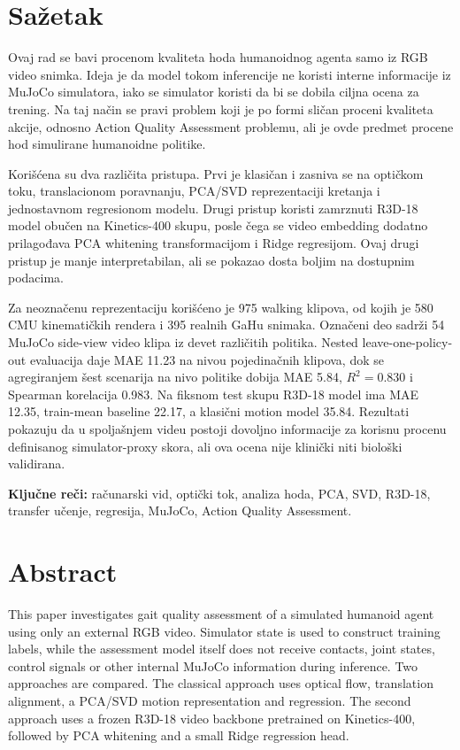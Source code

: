 ﻿\documentclass[12pt,a4paper]{report}
\begin{document}
\chapter*{Sažetak}
Ovaj rad se bavi procenom kvaliteta hoda humanoidnog agenta samo iz RGB video
snimka. Ideja je da model tokom inferencije ne koristi interne informacije iz
MuJoCo simulatora, iako se simulator koristi da bi se dobila ciljna ocena za
trening. Na taj način se pravi problem koji je po formi sličan proceni kvaliteta
akcije, odnosno Action Quality Assessment problemu, ali je ovde predmet procene
hod simulirane humanoidne politike.

Korišćena su dva različita pristupa. Prvi je klasičan i zasniva se na optičkom
toku, translacionom poravnanju, PCA/SVD reprezentaciji kretanja i jednostavnom
regresionom modelu. Drugi pristup koristi zamrznuti R3D-18 model obučen na
Kinetics-400 skupu, posle čega se video embedding dodatno prilagođava PCA
whitening transformacijom i Ridge regresijom. Ovaj drugi pristup je manje
interpretabilan, ali se pokazao dosta boljim na dostupnim podacima.

Za neoznačenu reprezentaciju korišćeno je 975 walking klipova, od kojih je 580
CMU kinematičkih rendera i 395 realnih GaHu snimaka. Označeni deo sadrži 54
MuJoCo side-view video klipa iz devet različitih politika. Nested
leave-one-policy-out evaluacija daje MAE 11.23 na nivou pojedinačnih klipova,
dok se agregiranjem šest scenarija na nivo politike dobija MAE 5.84,
$R^2=0.830$ i Spearman korelacija 0.983. Na fiksnom test skupu R3D-18 model ima
MAE 12.35, train-mean baseline 22.17, a klasični motion model 35.84. Rezultati
pokazuju da u spoljašnjem videu postoji dovoljno informacije za korisnu procenu
definisanog simulator-proxy skora, ali ova ocena nije klinički niti biološki
validirana.

\noindent\textbf{Ključne reči:} računarski vid, optički tok, analiza hoda, PCA,
SVD, R3D-18, transfer učenje, regresija, MuJoCo, Action Quality Assessment.

\clearpage

\chapter*{Abstract}
This paper investigates gait quality assessment of a simulated humanoid agent
using only an external RGB video. Simulator state is used to construct training
labels, while the assessment model itself does not receive contacts, joint
states, control signals or other internal MuJoCo information during inference.
Two approaches are compared. The classical approach uses optical flow,
translation alignment, a PCA/SVD motion representation and regression. The
second approach uses a frozen R3D-18 video backbone pretrained on Kinetics-400,
followed by PCA whitening and a small Ridge regression head.
\end{document}
